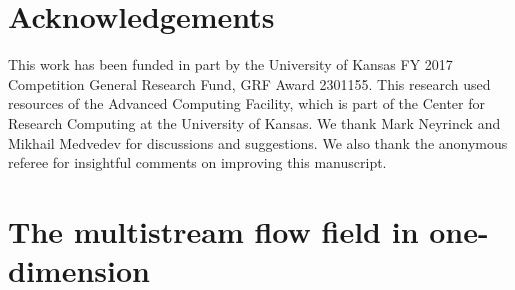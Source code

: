 \documentclass[fleqn,usenatbib,useAMS]{mnras}
\begin{document}
\section*{Acknowledgements}

This work has been funded in part by the University of Kansas FY 2017 Competition General Research Fund, GRF Award 2301155. This research used resources of the Advanced Computing Facility, which is part of the Center for Research Computing at the University of Kansas. We thank Mark Neyrinck and Mikhail Medvedev for discussions and suggestions. We also thank the anonymous referee for insightful comments on improving this manuscript. 





\appendix

\section{The multistream flow field in one-dimension}
\label{appendix:nstream}
\end{document}
